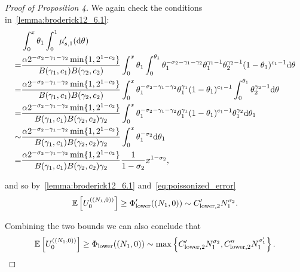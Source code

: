\begin{proof}[Proof of Proposition 4]
We again check the conditions in~\cref{lemma:broderick12_6.1}:
\begin{align*}
    &\int_0^x \variantfreqperpop{1} \int_0^1 \mu'_{s,1}(\de\vecvariantfreq{})\\
    =& \frac{\mass 2^{-\rate{2}-\corr{1}-\corr{2}}\min\{1, 2^{1-\conc{2}}\}}{B(\corr{1}, \conc{1})B(\corr{2}, \conc{2})}\int_0^x \variantfreqperpop{1} \int_0^{\variantfreqperpop{1}} \variantfreqperpop{1}^{-\rate{2}-\corr{1}-\corr{2}} \variantfreqperpop{1}^{\corr{1}-1}\variantfreqperpop{2}^{\corr{2}-1}(1-\variantfreqperpop{1})^{\conc{1}-1}\de\vecvariantfreq{}\\
    =& \frac{\mass 2^{-\rate{2}-\corr{1}-\corr{2}}\min\{1, 2^{1-\conc{2}}\}}{B(\corr{1}, \conc{1})B(\corr{2}, \conc{2})}\int_0^x \variantfreqperpop{1}^{-\rate{2}-\corr{1}-\corr{2}} \variantfreqperpop{1}^{\corr{1}} (1-\variantfreqperpop{1})^{\conc{1}-1} \int_0^{\variantfreqperpop{1}} \variantfreqperpop{2}^{\corr{2}-1}\de\vecvariantfreq{}\\
    =&\frac{\mass 2^{-\rate{2}-\corr{1}-\corr{2}}\min\{1, 2^{1-\conc{2}}\}}{B(\corr{1}, \conc{1})B(\corr{2}, \conc{2})\corr{2}}\int_0^x \variantfreqperpop{1}^{-\rate{2}-\corr{1}-\corr{2}} \variantfreqperpop{1}^{\corr{1}} (1-\variantfreqperpop{1})^{\conc{1}-1} \variantfreqperpop{1}^{\corr{2}}\de\variantfreqperpop{1}\\
    \sim & \frac{\mass 2^{-\rate{2}-\corr{1}-\corr{2}}\min\{1, 2^{1-\conc{2}}\}}{B(\corr{1}, \conc{1})B(\corr{2}, \conc{2})\corr{2}}\int_0^x \variantfreqperpop{1}^{-\rate{2}} \de\variantfreqperpop{1}\\
    =& \frac{\mass 2^{-\rate{2}-\corr{1}-\corr{2}}\min\{1, 2^{1-\conc{2}}\}}{B(\corr{1}, \conc{1})B(\corr{2}, \conc{2})\corr{2}} \frac{1}{1-\rate{2}}x^{1-\rate{2}},
\end{align*}

and so by~\cref{lemma:broderick12_6.1} and~\cref{eq:poissonized_error}
\begin{equation}
    \E\left[\news{\zerovec}{(\samplesize{1}, 0)}\right]\ge \altlowerbound(( \samplesize{1},0))\sim \constantlowerwithotherrate{2} \samplesize{1}^{\rate{2}} .
    \label{eq:lowerbound_2l1_pop1_alt2} 
\end{equation}

Combining the two bounds we can also conclude that 
\begin{equation}
    \E\left[\news{\zerovec}{(\samplesize{1}, 0)}\right]\ge \lowerbound(( \samplesize{1},0))\sim \max\left\{\constantlowerwithotherrate{2}\samplesize{1}^{\rate{2}}, \constantlowerwithrateprime{2}\samplesize{1}^{\rate{1}'} \right\}.
    \label{eq:lowerbound_2l1_pop1} 
\end{equation}






\end{proof}
